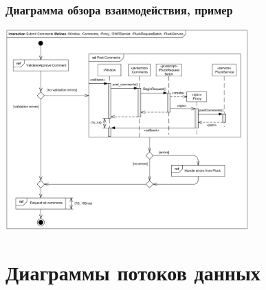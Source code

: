 \documentclass{../../slides-style}
\begin{document}
    \begin{frame}
        \frametitle{Диаграмма обзора взаимодействия, пример}
        \begin{center}
            \includegraphics[width=0.7\textwidth]{interactionOverviewExample.png}
        \end{center}
    \end{frame}

    \section{Диаграммы потоков данных}
\end{document}
